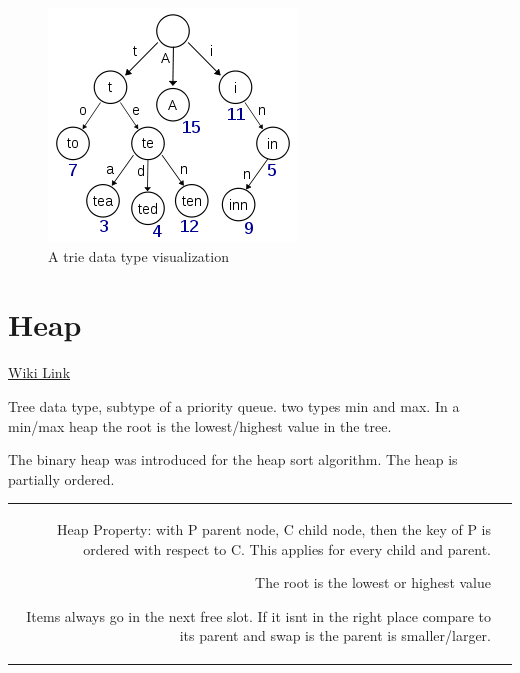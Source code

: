 \documentclass{notes}
\begin{document}
\begin{table}
	\begin{tabular}{r p{}}
		
	\end{tabular}
\end{table}

\begin{figure}
	\centering
	\includegraphics[width=.5\textwidth]{trie.png}
	\caption{A trie data type visualization}
\end{figure}



\section{Heap}

\href{https://en.wikipedia.org/wiki/Heap_%28data_structure%29}{Wiki Link}

	Tree data type, subtype of a priority queue. two types \ra min and max. In a min/max heap the root is the lowest/highest value in the tree.

	The binary heap was introduced for the heap sort algorithm. The heap is partially ordered.
	\begin{tabular}{rp{}}
		\item Heap Property: with P \ra parent node, C \ra child node, then the key of P is ordered with respect to C. This applies for every child and parent.
		\item The root is the lowest or highest value
		\item Items always go in the next free slot. If it isnt in the right place compare to its parent and swap is the parent is smaller/larger.
	\end{tabular}
\end{document}
